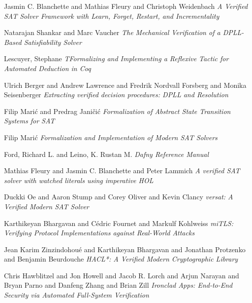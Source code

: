 \begin{thebibliography}{9}
Jasmin C. Blanchette and
               Mathias Fleury and
               Christoph Weidenbach
\textit{A Verified {SAT} Solver Framework with Learn, Forget, Restart, and
Incrementality}

Natarajan Shankar and
               Marc Vaucher
\textit{The Mechanical Verification of a {DPLL}-Based Satisfiability Solver}

Lescuyer, Stephane
\textit{TFormalizing and Implementing a Reflexive Tactic for Automated Deduction in {C}oq}

Ulrich Berger and
               Andrew Lawrence and
               Fredrik Nordvall Forsberg and
               Monika Seisenberger
\textit{Extracting verified decision procedures: {DPLL} and Resolution}

Filip Mari{\'{c}} and
               Predrag Janičić
\textit{Formalization of Abstract State Transition Systems for {SAT}}

Filip Mari{\'{c}}
\textit{Formalization and Implementation of Modern {SAT} Solvers}

Ford, Richard L. and Leino, K. Rustan M.
\textit{Dafny Reference Manual}

Mathias Fleury and
               Jasmin C. Blanchette and
               Peter Lammich
\textit{A verified {SAT} solver with watched literals using imperative {HOL}}

Duckki Oe and
               Aaron Stump and
               Corey Oliver and
               Kevin Clancy
\textit{versat: {A} Verified Modern {SAT} Solver}

Karthikeyan Bhargavan and
               C{\'{e}}dric Fournet and
               Markulf Kohlweiss
\textit{{miTLS}: Verifying Protocol Implementations against Real-World Attacks}

Jean Karim Zinzindohou{\'{e}} and
               Karthikeyan Bhargavan and
               Jonathan Protzenko and
               Benjamin Beurdouche
\textit{{HACL*}: {A} Verified Modern Cryptographic Library}

Chris Hawblitzel and
               Jon Howell and
               Jacob R. Lorch and
               Arjun Narayan and
               Bryan Parno and
               Danfeng Zhang and
               Brian Zill
\textit{Ironclad Apps: End-to-End Security via Automated Full-System Verification}


\end{thebibliography}
